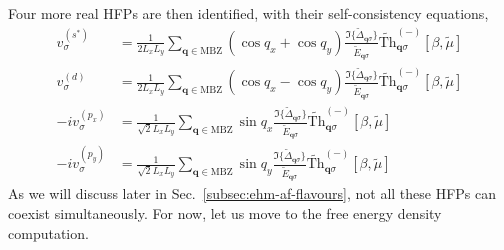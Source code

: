 Four more real HFPs are then identified, with their self-consistency equations,
\begin{align}
	v^{(s^*)}_\sigma &= \frac{1}{2L_x L_y} \sum_{\mathbf{q}\in\mathrm{MBZ}} (\cos q_x + \cos q_y)
	\frac{\Im\lbrace\tilde{\Delta}_{\mathbf{q}\sigma}\rbrace}{\tilde{E}_{\mathbf{q}\sigma}} \tilde{\mathrm{Th}}_{\mathbf{q}\sigma}^{(-)}[\beta,\tilde{\mu}]
	\label{eq:af-vS-self-consistency}\\
	v^{(d)}_\sigma &= \frac{1}{2L_x L_y} \sum_{\mathbf{q}\in\mathrm{MBZ}} (\cos q_x - \cos q_y)
	\frac{\Im\lbrace\tilde{\Delta}_{\mathbf{q}\sigma}\rbrace}{\tilde{E}_{\mathbf{q}\sigma}} \tilde{\mathrm{Th}}_{\mathbf{q}\sigma}^{(-)}[\beta,\tilde{\mu}]
	\label{eq:af-vd-self-consistency}\\
	-iv^{(p_x)}_\sigma &= \frac{1}{\sqrt{2}L_x L_y} \sum_{\mathbf{q}\in\mathrm{MBZ}} \sin q_x
	\frac{\Im\lbrace\tilde{\Delta}_{\mathbf{q}\sigma}\rbrace}{\tilde{E}_{\mathbf{q}\sigma}} \tilde{\mathrm{Th}}_{\mathbf{q}\sigma}^{(-)}[\beta,\tilde{\mu}]
	\label{eq:af-vpx-self-consistency}\\
	-iv^{(p_y)}_\sigma &= \frac{1}{\sqrt{2}L_x L_y} \sum_{\mathbf{q}\in\mathrm{MBZ}} \sin q_y
	\frac{\Im\lbrace\tilde{\Delta}_{\mathbf{q}\sigma}\rbrace}{\tilde{E}_{\mathbf{q}\sigma}} \tilde{\mathrm{Th}}_{\mathbf{q}\sigma}^{(-)}[\beta,\tilde{\mu}]
	\label{eq:af-vpy-self-consistency}
\end{align}
As we will discuss later in Sec.~\ref{subsec:ehm-af-flavours}, not all these HFPs can coexist simultaneously. For now, let us move to the free energy density computation.

